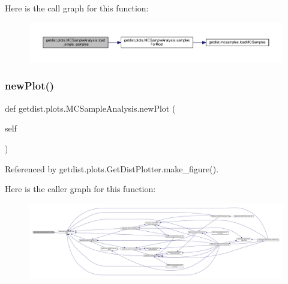 Here is the call graph for this function\+:
\nopagebreak
\begin{figure}[H]
\begin{center}
\leavevmode
\includegraphics[width=350pt]{classgetdist_1_1plots_1_1MCSampleAnalysis_a993420585e2d3d9625272366173756cf_cgraph}
\end{center}
\end{figure}
\mbox{\label{classgetdist_1_1plots_1_1MCSampleAnalysis_a46a583be508db9c57da6afe4766a4279}} 
\subsubsection{\texorpdfstring{new\+Plot()}{newPlot()}}
{\footnotesize\ttfamily def getdist.\+plots.\+M\+C\+Sample\+Analysis.\+new\+Plot (\begin{DoxyParamCaption}\item[{}]{self }\end{DoxyParamCaption})}



Referenced by getdist.\+plots.\+Get\+Dist\+Plotter.\+make\+\_\+figure().

Here is the caller graph for this function\+:
\nopagebreak
\begin{figure}[H]
\begin{center}
\leavevmode
\includegraphics[width=350pt]{classgetdist_1_1plots_1_1MCSampleAnalysis_a46a583be508db9c57da6afe4766a4279_icgraph}
\end{center}
\end{figure}
\mbox{\label{classgetdist_1_1plots_1_1MCSampleAnalysis_ad38551dc8499923e02dd925ab2a0e6cf}} 
